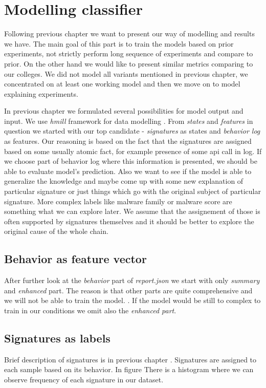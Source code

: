 \chapter{Modelling classifier}
Following previous chapter we want to present our way of modelling and results we have. The main goal of this part is to train the models based on prior experiments, not strictly perform long sequence of experiments and compare to prior. On the other hand we would like to present similar metrics comparing to our colleges. We did not model all variants mentioned in previous chapter, we concentrated on at least one working model and then we move on to model explaining experiments.

In previous chapter we formulated several possibilities for model output and input. We use \emph{hmill} framework for data modelling . From \emph{states} and \emph{features} in question we started with our top candidate - \emph{signatures} as states and \emph{behavior log} as features. Our reasoning is based on the fact that the signatures are assigned based on some usually atomic fact, for example presence of some api call in log. If we choose part of behavior log where this information is presented, we should be able to evaluate model's prediction. Also we want to see if the model is able to generalize the knowledge and maybe come up with some new explanation of particular signature or just things which go with the original subject of particular signature. More complex labels like malware family or malware score are something what we can explore later. We assume that the assignement of those is often supported by signatures themselves and it should be better to explore the original cause of the whole chain.

\section{Behavior as feature vector}
After further look at the \emph{behavior} part of \emph{report.json} we start with only \emph{summary} and \emph{enhanced} part. The reason is that other parts are quite comprehensive and we will not be able to train the model. . If the model would be still to complex to train in our conditions we omit also the \emph{enhanced part}.

\section{Signatures as labels}
Brief description of signatures is in previous chapter . Signatures are assigned to each sample based on its behavior. In figure  There is a histogram where we can observe frequency of each signature in our dataset.

